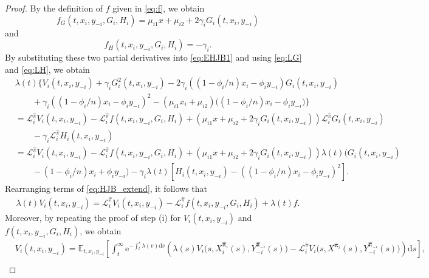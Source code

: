 \documentclass[11pt]{article}
\newcommand \drm {\mathrm{d}}
\newcommand \e {\mathrm{e}}
\numberwithin{equation}{section}
\newcommand{\bpi}{\boldsymbol{\pi}}
\providecommand{\smn}{{-}} %
\begin{document}
\begin{proof}
		
		By the definition of \(f\) given in \eqref{eq:f}, we obtain
		\[
		f_G(t, x_i, y_{\smn i}, G_i, H_i) = \mu_{i1}x+\mu_{i2} + 2\gamma_i G_i(t, x_i, y_{\smn i})
		\]
		and
		\[
		f_H(t, x_i, y_{\smn i}, G_i, H_i) = -\gamma_i.
		\]
		By substituting these two partial derivatives into \eqref{eq:EHJB1} and using \eqref{eq:LG} and \eqref{eq:LH}, we obtain
		\begin{align}
			&	\lambda(t)\Big\{V_i(t,x_i,y_{\smn i})+\gamma_i G^2_i(t,x_i,y_{\smn i})-2\gamma_i\left((1-\phi_i/n)x_i-\phi_i y_{\smn i}\right) G_i(t,x_i,y_{\smn i})\\
			&\quad\quad+\gamma_i\left((1-\phi_i/n)x_i-\phi_i y_{\smn i}\right)^2-(\mu_{i1}x_i+\mu_{i2})\big((1-\phi_i/n)x_i-\phi_i y_{\smn i}\big)\Big\}\\
			&=\mathcal{L}_i^{\widehat{\pi}}V_i(t,x_i,y_{\smn i})-\mathcal{L}_i^{\widehat{\pi}}f(t,x_i,y_{\smn i},G_i,H_i)+\left(\mu_{i1}x+\mu_{i2}+2\gamma_i G_i(t,x_i,y_{\smn i})\right)\mathcal{L}_i^{\widehat{\pi}} G_i(t,x_i,y_{\smn i})\\
			&\quad\quad-\gamma_i\mathcal{L}_i^{\widehat{\pi}}H_i(t,x_i,y_{\smn i})\\
			&=\mathcal{L}_i^{\widehat{\pi}}V_i(t,x_i,y_{\smn i})-\mathcal{L}_i^{\widehat{\pi}}f(t,x_i,y_{\smn i},G_i,H_i)+\left(\mu_{i1}x+\mu_{i2}+2\gamma_i G_i(t,x_i,y_{\smn i})\right)\lambda(t)\big(G_i(t,x_i,y_{\smn i})\\
			&\quad\quad-(1-\phi_i/n)x_i+\phi_iy_{\smn i}\big)-\gamma_i \lambda(t)\left[H_i(t,x_i,y_{\smn i})-\left((1-\phi_i/n)x_i-\phi_iy_{\smn i}\right)^2\right]. \label{eq:HJB_extend}
		\end{align}
		Rearranging terms of \eqref{eq:HJB_extend}, it follows that
		\begin{align}\label{eq:EHJB2}
			\lambda(t)V_i(t,x_i,y_{\smn i})=\mathcal{L}^{\widehat{\pi}}_iV_i(t,x_i,y_{\smn i})-\mathcal{L}^{\widehat{\pi}}_if\left(t,x_i,y_{\smn i},G_i,H_i\right)+\lambda(t)f.
		\end{align}
Moreover, by repeating the proof of step (i) for \(V_i(t,x_i,y_{\smn i})\) and \(f(t,x_i,y_{\smn i},G_i,H_i)\), we obtain
\begin{align}
			&V_i(t,x_i,y_{\smn i})=\mathbb{E}_{t,x_i,y_{\smn i}}\left[\int_t^\infty \e^{-\int_t^s \lambda(v)\drm v}\left(\lambda(s)V_i\big(s,X_i^{\widehat{\bm{\pi}}_i}(s),Y^{\widehat{\bpi}_{\smn i}}_{\smn i}(s)\big) -\mathcal{L}_i^{\widehat{\pi}}V_i\big(s,X^{\widehat{\bm{\pi}}_i}(s),Y^{\widehat{\bpi}_{\smn i}}_{\smn i}(s)\big)\right)\drm s\right],
\\
\label{eq:V-1}
\end{align}

\end{proof}
\end{document}
